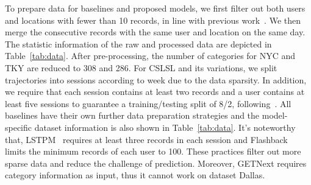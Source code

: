 \documentclass[sigconf]{acmart}
\begin{document}
    To prepare data for baselines and proposed models, we first filter out both users and locations with fewer than 10 records, in line with previous work~\cite{feng2018deepmove,sun2020go}. We then merge the consecutive records with the same user and location on the same day. The statistic information of the raw and processed data are depicted in Table~\ref{tab:data}. After pre-processing, the number of categories for NYC and TKY are reduced to 308 and 286. For CSLSL and its variations, we split trajectories into sessions according to week due to the data sparsity. In addition, we require that each session contains at least two records and a user contains at least five sessions to guarantee a training/testing split of 8/2, following~\cite{feng2018deepmove}.  
    All baselines have their own further data preparation strategies and the model-specific dataset information is also shown in Table~\ref{tab:data}. It's noteworthy that, LSTPM~\cite{sun2020go} requires at least three records in each session and Flashback~\cite{yang2020location} limits the minimum records of each user to 100. These practices filter out more sparse data and reduce the challenge of prediction. Moreover, GETNext requires category information as input, thus it cannot work on dataset Dallas.
    
\end{document}
